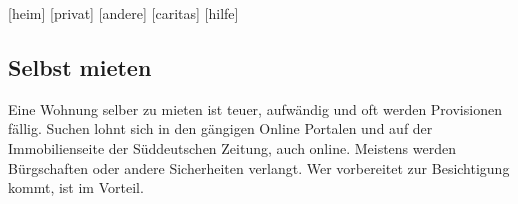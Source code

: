 \begin{urlList}
	[heim]
	[privat]
	[andere]
	[caritas]
	[hilfe]
\end{urlList}


\subsection*{Selbst mieten} 
Eine Wohnung selber zu mieten ist teuer, aufwändig und oft werden Provisionen fällig. Suchen
lohnt sich in den gängigen Online Portalen und auf der Immobilienseite der
Süddeutschen Zeitung, auch online. Meistens werden Bürgschaften oder andere
Sicherheiten verlangt.  Wer vorbereitet zur Besichtigung kommt, ist im Vorteil.


